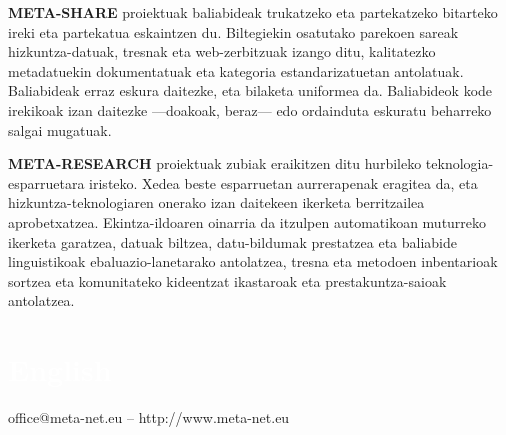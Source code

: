 \begin{multicols}{2}
\textbf{META-SHARE} proiektuak baliabideak trukatzeko eta partekatzeko bitarteko ireki eta partekatua eskaintzen du. Biltegiekin osatutako parekoen sareak hizkuntza-datuak, tresnak eta web-zerbitzuak izango ditu, kalitatezko metadatuekin dokumentatuak eta kategoria estandarizatuetan antolatuak. Baliabideak erraz eskura daitezke, eta bilaketa uniformea da. Baliabideok kode irekikoak izan daitezke —doakoak, beraz— edo ordainduta eskuratu beharreko salgai mugatuak. 

 \textbf{META-RESEARCH} proiektuak zubiak eraikitzen ditu hurbileko teknologia-esparruetara iristeko. Xedea beste esparruetan aurrerapenak eragitea da, eta hizkuntza-teknologiaren onerako izan daitekeen ikerketa berritzailea aprobetxatzea. Ekintza-ildoaren oinarria da itzulpen automatikoan muturreko ikerketa garatzea, datuak biltzea, datu-bildumak prestatzea eta baliabide linguistikoak ebaluazio-lanetarako antolatzea, tresna eta metodoen inbentarioak sortzea eta komunitateko kideentzat ikastaroak eta prestakuntza-saioak antolatzea.
\end{multicols}

\vfill

\makeatletter
{}
{
  \renewcommand*{\theHsection}{\thepart.\thesection}
}
\makeatother
\part*{\textcolor{white}{English}}
\setcounter{section}{0}
\setcounter{figure}{0}

\centerline{office@meta-net.eu -- http://www.meta-net.eu}


\cleardoublepage




